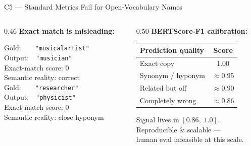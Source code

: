 \documentclass[aspectratio=169]{beamer}
\newcommand{\code}[1]{\texttt{\small #1}}
\begin{document}
\begin{frame}{C5 --- Standard Metrics Fail for Open-Vocabulary Names}

  \begin{columns}[T]
    \begin{column}{0.46\textwidth}
      \textbf{\textcolor{bad}{Exact match is misleading:}}
      \vspace{5pt}
      \begin{codebox}
        Gold:\ \ \ \ \code{"musicalartist"}\\
        Output:\ \ \code{"musician"}\\
        \textcolor{bad}{Exact-match score: 0}\\
        \textcolor{good}{Semantic reality: correct}\\[8pt]
        Gold:\ \ \ \ \code{"researcher"}\\
        Output:\ \ \code{"physicist"}\\
        \textcolor{bad}{Exact-match score: 0}\\
        \textcolor{good}{Semantic reality: close hyponym}
      \end{codebox}
    \end{column}
    \begin{column}{0.50\textwidth}
      \textbf{BERTScore-F1 calibration:}
      \vspace{5pt}
      \begin{tabular}{lc}
        \toprule
        Prediction quality & Score \\
        \midrule
        Exact copy         & 1.00 \\
        Synonym / hyponym  & $\approx 0.95$ \\
        Related but off    & $\approx 0.90$ \\
        Completely wrong   & $\approx 0.86$ \\
        \bottomrule
      \end{tabular}
      \vspace{8pt}
      \begin{keybox}
        Signal lives in $[0.86,\;1.0]$.\\
        Reproducible \& scalable ---\\
        human eval infeasible at this scale.
      \end{keybox}
    \end{column}
  \end{columns}
\end{frame}
\end{document}
